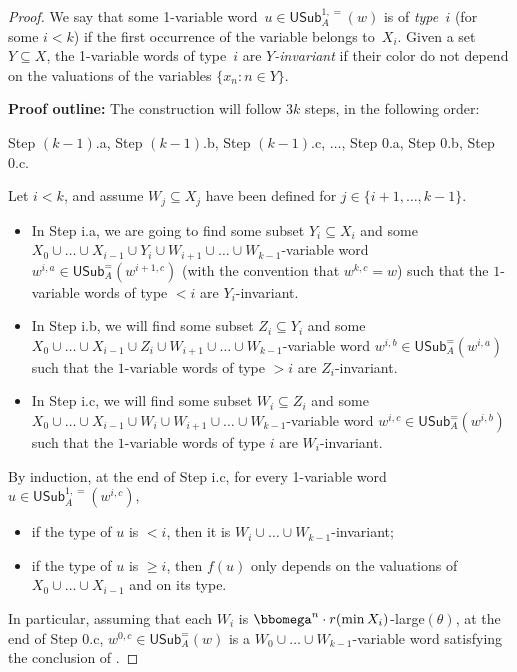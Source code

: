 \documentclass{article}
\numberwithin{theorem}{section}
\newcommand{\USub}{\mathsf{USub}}
\begin{document}
\begin{proof}
We say that some 1-variable word~$u \in \USub^{1,=}_A(w)$ is of \emph{type~$i$} (for some $i < k$) if the first occurrence of the variable belongs to~$X_i$. Given a set~$Y \subseteq X$, the 1-variable words of type~$i$ are \emph{$Y$-invariant} if their color do not depend on the valuations of the variables $\{x_n : n \in Y\}$.
\smallskip

\noindent
\textbf{Proof outline:}
The construction will follow $3k$ steps, in the following order:
\begin{center}
Step $(k-1)$.a, Step $(k-1)$.b, Step $(k-1)$.c, $\dots$, Step 0.a, Step 0.b, Step 0.c.
\end{center}
Let $i <k$, and assume $W_j \subseteq X_j$ have been defined for $j \in \{i+1, \dots, k-1\}$.
\begin{itemize}
    \item In Step i.a, we are going to find some subset $Y_i \subseteq X_i$ and some $X_0 \cup \dots \cup X_{i-1} \cup Y_i \cup W_{i+1} \cup \dots \cup W_{k-1}$-variable word $w^{i,a} \in \USub_A^=(w^{i+1,c})$ (with the convention that $w^{k,c} = w$) such that the $1$-variable words of type $< i$ are $Y_i$-invariant.
    \item In Step i.b, we will find some subset $Z_i \subseteq Y_i$ and some $X_0 \cup \dots \cup X_{i-1} \cup Z_i \cup W_{i+1} \cup \dots \cup W_{k-1}$-variable word $w^{i,b} \in \USub_A^=(w^{i,a})$ such that the $1$-variable words of type $>i$ are $Z_i$-invariant. 
    \item In Step i.c, we will find some subset $W_i \subseteq Z_i$ and some $X_0 \cup \dots \cup X_{i-1} \cup W_i \cup W_{i+1} \cup \dots \cup W_{k-1}$-variable word $w^{i,c} \in \USub_A^=(w^{i,b})$ such that the $1$-variable words of type $i$ are $W_i$-invariant.
\end{itemize}
By induction, at the end of Step i.c, for every 1-variable word $u \in \USub_A^{1,=}(w^{i,c})$,
\begin{itemize}
    \item if the type of $u$ is $< i$, then it is $W_i \cup \dots \cup W_{k-1}$-invariant;
    \item if the type of $u$ is $\geq i$, then $f(u)$ only depends on the valuations of~$X_0 \cup \dots \cup X_{i-1}$ and on its type.
\end{itemize}
In particular, assuming that each $W_i$ is $\bbomega^n \cdot r(\min X_i)$-large$(\theta)$, at the end of Step 0.c, $w^{0,c} \in \USub^=_A(w)$ is a $W_0 \cup \dots \cup W_{k-1}$-variable word satisfying the conclusion of .
\smallskip


\end{proof}
\end{document}

